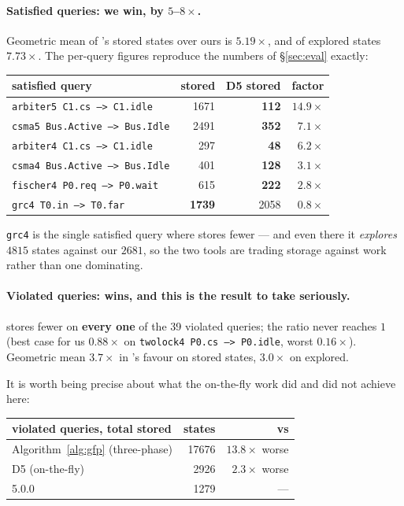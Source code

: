 \paragraph{Satisfied queries: we win, by $5$--$8\times$.}
Geometric mean of \verifyta{}'s stored states over ours is $5.19\times$, and of explored states
$7.73\times$. The per-query figures reproduce the numbers of \S\ref{sec:eval} exactly:

\begin{center}
\begin{tabular}{@{}lrrr@{}}
\toprule
satisfied query & \verifyta{} stored & D5 stored & factor \\
\midrule
\texttt{arbiter5 C1.cs --> C1.idle}    & 1671 & \textbf{112} & $14.9\times$ \\
\texttt{csma5 Bus.Active --> Bus.Idle} & 2491 & \textbf{352} & $7.1\times$ \\
\texttt{arbiter4 C1.cs --> C1.idle}    & 297  & \textbf{48}  & $6.2\times$ \\
\texttt{csma4 Bus.Active --> Bus.Idle} & 401  & \textbf{128} & $3.1\times$ \\
\texttt{fischer4 P0.req --> P0.wait}   & 615  & \textbf{222} & $2.8\times$ \\
\texttt{grc4 T0.in --> T0.far}         & \textbf{1739} & 2058 & $0.8\times$ \\
\bottomrule
\end{tabular}
\end{center}

\texttt{grc4} is the single satisfied query where \verifyta{} stores fewer --- and even there it
\emph{explores} $4815$ states against our $2681$, so the two tools are trading storage against
work rather than one dominating. \measured{}

\paragraph{Violated queries: \verifyta{} wins, and this is the result to take seriously.}
\verifyta{} stores fewer on \textbf{every one} of the 39 violated queries; the ratio never reaches
$1$ (best case for us $0.88\times$ on \texttt{twolock4 P0.cs --> P0.idle}, worst $0.16\times$).
Geometric mean $3.7\times$ in \verifyta{}'s favour on stored states, $3.0\times$ on explored.

It is worth being precise about what the on-the-fly work did and did not achieve here:

\begin{center}
\begin{tabular}{@{}lrr@{}}
\toprule
violated queries, total stored & states & vs \verifyta{} \\
\midrule
Algorithm~\ref{alg:gfp} (three-phase) & 17676 & $13.8\times$ worse \\
D5 (on-the-fly)                       & 2926  & $2.3\times$ worse \\
\verifyta{} 5.0.0                     & 1279  & --- \\
\bottomrule
\end{tabular}
\end{center}

